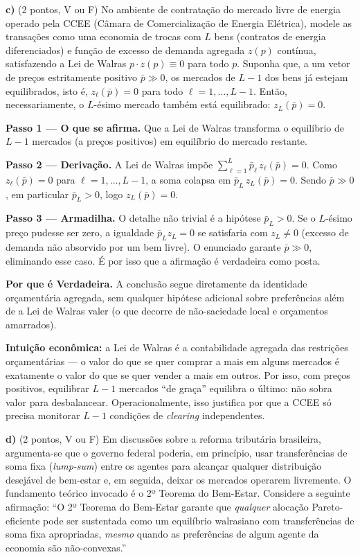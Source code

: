 \textbf{c)} (2 pontos, V ou F) No ambiente de contratação do mercado livre de energia operado pela CCEE (Câmara de Comercialização de Energia Elétrica), modele as transações como uma economia de trocas com $L$ bens (contratos de energia diferenciados) e função de excesso de demanda agregada $z(p)$ contínua, satisfazendo a Lei de Walras $p\cdot z(p)\equiv 0$ para todo $p$. Suponha que, a um vetor de preços estritamente positivo $\bar p \gg 0$, os mercados de $L-1$ dos bens já estejam equilibrados, isto é, $z_\ell(\bar p)=0$ para todo $\ell=1,\dots,L-1$. Então, necessariamente, o $L$-ésimo mercado também está equilibrado: $z_L(\bar p)=0$.

\begin{solucao}
\textbf{Passo 1 --- O que se afirma.} Que a Lei de Walras transforma o equilíbrio de $L-1$ mercados (a preços positivos) em equilíbrio do mercado restante.

\textbf{Passo 2 --- Derivação.} A Lei de Walras impõe $\displaystyle\sum_{\ell=1}^{L} \bar p_\ell\, z_\ell(\bar p)=0$. Como $z_\ell(\bar p)=0$ para $\ell=1,\dots,L-1$, a soma colapsa em $\bar p_L\, z_L(\bar p)=0$. Sendo $\bar p \gg 0$, em particular $\bar p_L>0$, logo $z_L(\bar p)=0$.

\textbf{Passo 3 --- Armadilha.} O detalhe não trivial é a hipótese $\bar p_L>0$. Se o $L$-ésimo preço pudesse ser zero, a igualdade $\bar p_L z_L=0$ se satisfaria com $z_L\neq 0$ (excesso de demanda não absorvido por um bem livre). O enunciado garante $\bar p\gg 0$, eliminando esse caso. É por isso que a afirmação é verdadeira como posta.

\textbf{Por que é Verdadeira.} A conclusão segue diretamente da identidade orçamentária agregada, sem qualquer hipótese adicional sobre preferências além de a Lei de Walras valer (o que decorre de não-saciedade local e orçamentos amarrados).

\textbf{Intuição econômica:} a Lei de Walras é a contabilidade agregada das restrições orçamentárias --- o valor do que se quer comprar a mais em alguns mercados é exatamente o valor do que se quer vender a mais em outros. Por isso, com preços positivos, equilibrar $L-1$ mercados ``de graça'' equilibra o último: não sobra valor para desbalancear. Operacionalmente, isso justifica por que a CCEE só precisa monitorar $L-1$ condições de \emph{clearing} independentes.
\end{solucao}

\textbf{d)} (2 pontos, V ou F) Em discussões sobre a reforma tributária brasileira, argumenta-se que o governo federal poderia, em princípio, usar transferências de soma fixa (\emph{lump-sum}) entre os agentes para alcançar qualquer distribuição desejável de bem-estar e, em seguida, deixar os mercados operarem livremente. O fundamento teórico invocado é o 2º Teorema do Bem-Estar. Considere a seguinte afirmação: ``O 2º Teorema do Bem-Estar garante que \emph{qualquer} alocação Pareto-eficiente pode ser sustentada como um equilíbrio walrasiano com transferências de soma fixa apropriadas, \emph{mesmo} quando as preferências de algum agente da economia são não-convexas.''

